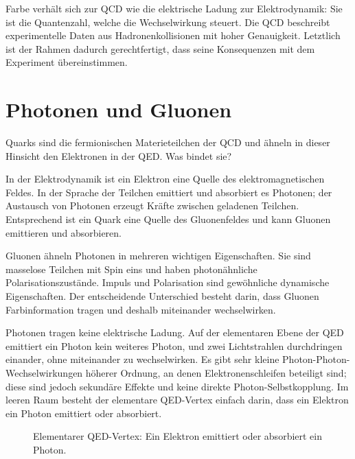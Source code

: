Farbe verhält sich zur QCD wie die elektrische Ladung zur Elektrodynamik: Sie ist die Quantenzahl, welche die Wechselwirkung steuert. Die QCD beschreibt experimentelle Daten aus Hadronenkollisionen mit hoher Genauigkeit. Letztlich ist der Rahmen dadurch gerechtfertigt, dass seine Konsequenzen mit dem Experiment übereinstimmen.

\section{Photonen und Gluonen}

Quarks sind die fermionischen Materieteilchen der QCD und ähneln in dieser Hinsicht den Elektronen in der QED. Was bindet sie?

In der Elektrodynamik ist ein Elektron eine Quelle des elektromagnetischen Feldes. In der Sprache der Teilchen emittiert und absorbiert es Photonen; der Austausch von Photonen erzeugt Kräfte zwischen geladenen Teilchen. Entsprechend ist ein Quark eine Quelle des Gluonenfeldes und kann Gluonen emittieren und absorbieren.

Gluonen ähneln Photonen in mehreren wichtigen Eigenschaften. Sie sind masselose Teilchen mit Spin eins und haben photonähnliche Polarisationszustände. Impuls und Polarisation sind gewöhnliche dynamische Eigenschaften. Der entscheidende Unterschied besteht darin, dass Gluonen Farbinformation tragen und deshalb miteinander wechselwirken.

Photonen tragen keine elektrische Ladung. Auf der elementaren Ebene der QED emittiert ein Photon kein weiteres Photon, und zwei Lichtstrahlen durchdringen einander, ohne miteinander zu wechselwirken. Es gibt sehr kleine Photon-Photon-Wechselwirkungen höherer Ordnung, an denen Elektronenschleifen beteiligt sind; diese sind jedoch sekundäre Effekte und keine direkte Photon-Selbstkopplung. Im leeren Raum besteht der elementare QED-Vertex einfach darin, dass ein Elektron ein Photon emittiert oder absorbiert.

\begin{figure}[h]
\centering
{}
\caption{Elementarer QED-Vertex: Ein Elektron emittiert oder absorbiert ein Photon.}
\end{figure}

